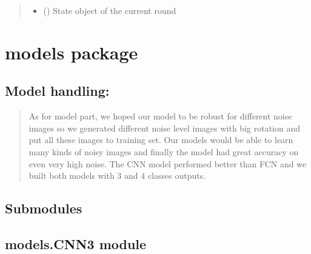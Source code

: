 \documentclass[letterpaper,10pt,english]{sphinxmanual}
\begin{document}
\begin{fulllineitems}
\begin{fulllineitems}
\begin{quote}
\begin{description}
\begin{itemize}
\item {} 
\sphinxAtStartPar
{} ({\hyperref[\detokenize{client:client.state.ClientGameRoundState}]{}}) \textendash{} State object of the current round

\end{itemize}

\end{description}\end{quote}

\end{fulllineitems}


\end{fulllineitems}


\sphinxstepscope


\chapter{models package}
\label{\detokenize{models:models-package}}\label{\detokenize{models::doc}}

\section{Model handling:}
\label{\detokenize{models:model-handling}}\begin{quote}

\sphinxAtStartPar
As for model part, we hoped our model to be robust for different noise images so we generated different noise level images with big rotation and put all these images to training set. Our models would be able to learn many kinds of noisy images and finally the model had great accuracy on even very high noise. The CNN model performed better than FCN and we built both models with 3 and 4 classes outputs.
\end{quote}


\section{Submodules}
\label{\detokenize{models:submodules}}

\section{models.CNN3 module}
\label{\detokenize{models:module-models.CNN3}}\label{\detokenize{models:models-cnn3-module}}
\end{document}
